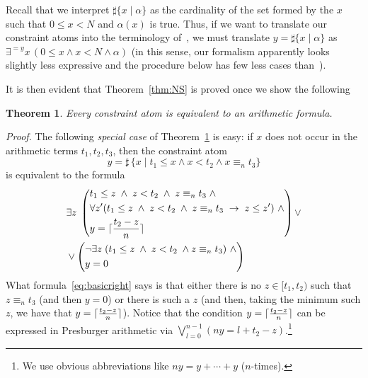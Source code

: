 \documentclass[11pt,a4paper]{article}
\newtheorem{theorem}{Theorem}
\begin{document}
{Recall that we interpret  $\sharp\{ x\mid \alpha\}$ as the cardinality of the set formed by the $x$ such that $0\leq x <N $ and $\alpha(x)$ is true. Thus, if we want to translate our 
constraint atoms into the terminology of~\cite{schweikhart}, we must translate $y=\sharp\{ x\mid \alpha\}$ as $\exists^{=y} x \, (0\leq x \wedge x< N \wedge \alpha)$
(in this sense, our formalism apparently looks slightly less expressive and the procedure below has few less cases than~\cite{schweikhart}).
 
 
 It is then evident that Theorem~\ref{thm:NS} is proved once 
we show the following 
\begin{theorem}\label{thm:NS1}
 Every constraint atom is equivalent to an arithmetic formula.
\end{theorem}

\noindent
\textit{Proof.}
The following \emph{special case} of Theorem~\ref{thm:NS1} is easy: if $x$ does not occur in the arithmetic terms $t_1, t_2, t_3$, then 
the constraint atom  
\begin{equation}\label{eq:basicleft}
 y= \sharp\, \{ x\mid t_1\leq x \wedge x < t_2 \wedge x\equiv_n t_3\}
\end{equation}
 is equivalent to the formula
 \begin{equation}\label{eq:basicright}
  \begin{aligned}
  &
  \exists z\;\left(
      \begin{aligned}
       & t_1\leq z \;\wedge\; z < t_2 \;\wedge\; z\equiv_n t_3 \;\wedge\; 
       \\ &  \forall z' (t_1\leq z \;\wedge\; z < t_2\; \wedge\; z\equiv_n t_3\;\to\; z\leq z') ~\wedge
       \\ & y =\lceil {t_2-z\over n}\rceil
      \end{aligned}
    \right) \vee 
  \\
  &
  \vee
  \left(
    \begin{aligned}
    & \neg \exists z \;(t_1\leq z \;\wedge\; z < t_2\; \wedge z\equiv_n t_3 ) ~\wedge 
    \\ & y=0 
    \end{aligned}
     \right)
  \end{aligned}
\end{equation}
What formula~\eqref{eq:basicright} says is that either there is no $z\in [t_1, t_2)$ such that $z\equiv_n t_3$ (and then $y=0$) or there is such a $z$ (and then, taking the minimum such $z$,
we have that $y=\lceil {t_2-z\over n}\rceil$). Notice that the condition  $y=\lceil {t_2-z\over n}\rceil$ can be expressed in Presburger arithmetic via $\bigvee_{l=0}^{n-1}  (ny=l+t_2-z)$.\footnote{
We use obvious abbreviations like $ny=y+\cdots + y$ ($n$-times).
}

}
\end{document}
